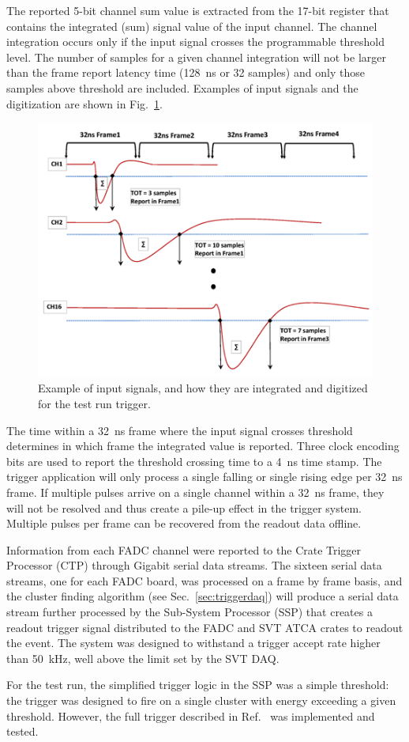 The reported 5-bit channel sum value is extracted from the 17-bit register that contains the integrated (sum) 
signal value of the input channel. The channel integration occurs only if the input signal crosses the 
programmable threshold level. The number of samples for a given channel integration will not be larger than 
the frame report latency time (128~ns or 32 samples) and only those samples above threshold are 
included. Examples of input signals and the digitization are shown in Fig.~\ref{fig:trigsamples}. 
\begin{figure}[]
\includegraphics[scale=0.9]{test2012/trigger//trigger_pulse_samples}
\caption{\small{Example of input signals, and how they are integrated and digitized for the test run trigger.}}\label{fig:trigsamples}
\end{figure}
The time within a 32~ns frame where the input signal crosses threshold determines in which frame the 
integrated value is reported. Three clock encoding bits are used to report the threshold crossing time to 
a 4~ns time stamp.  
The trigger application will only process a single falling or single rising edge per 32~ns frame. If multiple 
pulses arrive on a single channel within a 32~ns frame, they will not be resolved and thus create a pile-up 
effect in the trigger system. Multiple pulses per frame can be recovered from the readout data offline.

Information from each FADC channel were reported to the Crate Trigger Processor (CTP) through Gigabit 
serial data streams. The sixteen serial data streams, one for each FADC board, was processed on a frame 
by frame basis, and the cluster finding algorithm (see Sec.~\ref{sec:triggerdaq}) will produce a serial data 
stream further processed by the Sub-System Processor (SSP) that creates a readout trigger signal 
distributed to the FADC and SVT ATCA crates to readout the event. The system was designed to withstand 
a trigger accept rate higher than 50~kHz, well above the limit set by the SVT DAQ.  

For the test run, the simplified trigger logic in the SSP was a simple threshold: the trigger was designed 
to fire on a single cluster with energy exceeding a given threshold. However, the full trigger described in 
Ref.~\cite{HPS_tPROP} was implemented and tested.
